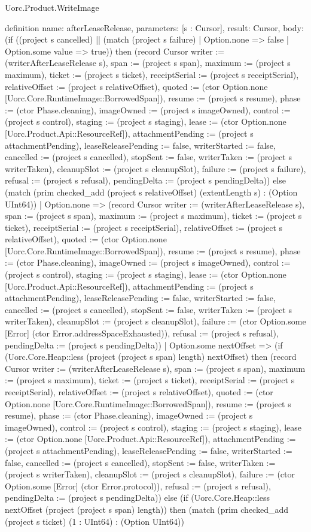 \begin{lexlean}{Uorc.Product.WriteImage}
\begin{semanticmodule}
definition{
  name: afterLeaseRelease,
  parameters: [s : Cursor],
  result: Cursor,
  body: (if ((project s cancelled) || (match (project s failure)
    | Option.none => false
    | Option.some value => true)) then (record Cursor {writer := (writerAfterLeaseRelease s), span := (project s span), maximum := (project s maximum), ticket := (project s ticket), receiptSerial := (project s receiptSerial), relativeOffset := (project s relativeOffset), quoted := (ctor Option.none [Uorc.Core.RuntimeImage::BorrowedSpan]), resume := (project s resume), phase := (ctor Phase.cleaning), imageOwned := (project s imageOwned), control := (project s control), staging := (project s staging), lease := (ctor Option.none [Uorc.Product.Api::ResourceRef]), attachmentPending := (project s attachmentPending), leaseReleasePending := false, writerStarted := false, cancelled := (project s cancelled), stopSent := false, writerTaken := (project s writerTaken), cleanupSlot := (project s cleanupSlot), failure := (project s failure), refusal := (project s refusal), pendingDelta := (project s pendingDelta)}) else (match (prim checked_add (project s relativeOffset) (extentLength s) : (Option UInt64))
    | Option.none => (record Cursor {writer := (writerAfterLeaseRelease s), span := (project s span), maximum := (project s maximum), ticket := (project s ticket), receiptSerial := (project s receiptSerial), relativeOffset := (project s relativeOffset), quoted := (ctor Option.none [Uorc.Core.RuntimeImage::BorrowedSpan]), resume := (project s resume), phase := (ctor Phase.cleaning), imageOwned := (project s imageOwned), control := (project s control), staging := (project s staging), lease := (ctor Option.none [Uorc.Product.Api::ResourceRef]), attachmentPending := (project s attachmentPending), leaseReleasePending := false, writerStarted := false, cancelled := (project s cancelled), stopSent := false, writerTaken := (project s writerTaken), cleanupSlot := (project s cleanupSlot), failure := (ctor Option.some [Error] (ctor Error.addressSpaceExhausted)), refusal := (project s refusal), pendingDelta := (project s pendingDelta)})
    | Option.some nextOffset => (if (Uorc.Core.Heap::less (project (project s span) length) nextOffset) then (record Cursor {writer := (writerAfterLeaseRelease s), span := (project s span), maximum := (project s maximum), ticket := (project s ticket), receiptSerial := (project s receiptSerial), relativeOffset := (project s relativeOffset), quoted := (ctor Option.none [Uorc.Core.RuntimeImage::BorrowedSpan]), resume := (project s resume), phase := (ctor Phase.cleaning), imageOwned := (project s imageOwned), control := (project s control), staging := (project s staging), lease := (ctor Option.none [Uorc.Product.Api::ResourceRef]), attachmentPending := (project s attachmentPending), leaseReleasePending := false, writerStarted := false, cancelled := (project s cancelled), stopSent := false, writerTaken := (project s writerTaken), cleanupSlot := (project s cleanupSlot), failure := (ctor Option.some [Error] (ctor Error.protocol)), refusal := (project s refusal), pendingDelta := (project s pendingDelta)}) else (if (Uorc.Core.Heap::less nextOffset (project (project s span) length)) then (match (prim checked_add (project s ticket) (1 : UInt64) : (Option UInt64))
}
\end{semanticmodule}
\end{lexlean}
